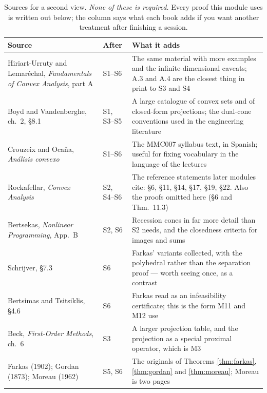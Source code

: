 \documentclass[11pt,a4paper]{article}
\theoremstyle{definition}
\theoremstyle{plain}
\theoremstyle{remark}
\begin{document}
\begin{table}[!ht]
\centering
\small
\caption{Sources for a second view. \emph{None of these is required.} Every proof this module
uses is written out below; the column says what each book adds if you want another treatment
after finishing a session.}
\label{tab:sources}
\begin{tabular}{@{}L{5.2cm} L{1.9cm} L{7.8cm}@{}}
\toprule
\textbf{Source} & \textbf{After} & \textbf{What it adds} \\
\midrule
Hiriart-Urruty and Lemar\'echal, \emph{Fundamentals of Convex Analysis}, part A
  & S1--S6
  & The same material with more examples and the infinite-dimensional caveats; A.3 and A.4 are
    the closest thing in print to S3 and S4 \\
Boyd and Vandenberghe, ch.~2, \S 8.1
  & S1, S3--S5
  & A large catalogue of convex sets and of closed-form projections; the dual-cone conventions
    used in the engineering literature \\
Crouzeix and Oca\~na, \emph{An\'alisis convexo}
  & S1--S6
  & The MMC007 syllabus text, in Spanish; useful for fixing vocabulary in the language of the
    lectures \\
Rockafellar, \emph{Convex Analysis}
  & S2, S4--S6
  & The reference statements later modules cite: \S 6, \S 11, \S 14, \S 17, \S 19, \S 22.
    Also the proofs omitted here (\S 6 and Thm.~11.3) \\
Bertsekas, \emph{Nonlinear Programming}, App.~B
  & S2, S6
  & Recession cones in far more detail than S2 needs, and the closedness criteria for images
    and sums \\
Schrijver, \S 7.3
  & S6
  & Farkas' variants collected, with the polyhedral rather than the separation proof --- worth
    seeing once, as a contrast \\
Bertsimas and Tsitsiklis, \S 4.6
  & S6
  & Farkas read as an infeasibility certificate; this is the form M11 and M12 use \\
Beck, \emph{First-Order Methods}, ch.~6
  & S3
  & A larger projection table, and the projection as a special proximal operator, which is M3 \\
Farkas (1902); Gordan (1873); Moreau (1962)
  & S5, S6
  & The originals of Theorems \ref{thm:farkas}, \ref{thm:gordan} and \ref{thm:moreau}; Moreau
    is two pages \\
\bottomrule
\end{tabular}
\end{table}

\clearpage
\end{document}
